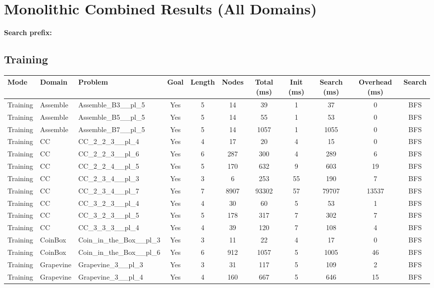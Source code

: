 \documentclass{article}
\begin{document}
\section*{Monolithic Combined Results (All Domains)}
\textbf{Search prefix:} 
\\[0.5cm]
\subsection*{Training}
\begin{tabular}{lllcccccccc}
\toprule
Mode & Domain & Problem & Goal & Length & Nodes & Total (ms) & Init (ms) & Search (ms) & Overhead (ms) & Search \\
\midrule
Training & Assemble & Assemble\_B3\_\_pl\_5 & Yes & 5 & 14 & 39 & 1 & 37 & 0 & BFS \\
Training & Assemble & Assemble\_B5\_\_pl\_5 & Yes & 5 & 14 & 55 & 1 & 53 & 0 & BFS \\
Training & Assemble & Assemble\_B7\_\_pl\_5 & Yes & 5 & 14 & 1057 & 1 & 1055 & 0 & BFS \\
Training & CC & CC\_2\_2\_3\_\_pl\_4 & Yes & 4 & 17 & 20 & 4 & 15 & 0 & BFS \\
Training & CC & CC\_2\_2\_3\_\_pl\_6 & Yes & 6 & 287 & 300 & 4 & 289 & 6 & BFS \\
Training & CC & CC\_2\_2\_4\_\_pl\_5 & Yes & 5 & 170 & 632 & 9 & 603 & 19 & BFS \\
Training & CC & CC\_2\_3\_4\_\_pl\_3 & Yes & 3 & 6 & 253 & 55 & 190 & 7 & BFS \\
Training & CC & CC\_2\_3\_4\_\_pl\_7 & Yes & 7 & 8907 & 93302 & 57 & 79707 & 13537 & BFS \\
Training & CC & CC\_3\_2\_3\_\_pl\_4 & Yes & 4 & 30 & 60 & 5 & 53 & 1 & BFS \\
Training & CC & CC\_3\_2\_3\_\_pl\_5 & Yes & 5 & 178 & 317 & 7 & 302 & 7 & BFS \\
Training & CC & CC\_3\_3\_3\_\_pl\_4 & Yes & 4 & 39 & 120 & 7 & 108 & 4 & BFS \\
Training & CoinBox & Coin\_in\_the\_Box\_\_pl\_3 & Yes & 3 & 11 & 22 & 4 & 17 & 0 & BFS \\
Training & CoinBox & Coin\_in\_the\_Box\_\_pl\_6 & Yes & 6 & 912 & 1057 & 5 & 1005 & 46 & BFS \\
Training & Grapevine & Grapevine\_3\_\_pl\_3 & Yes & 3 & 31 & 117 & 5 & 109 & 2 & BFS \\
Training & Grapevine & Grapevine\_3\_\_pl\_4 & Yes & 4 & 160 & 667 & 5 & 646 & 15 & BFS \\

\end{tabular}
\end{document}
